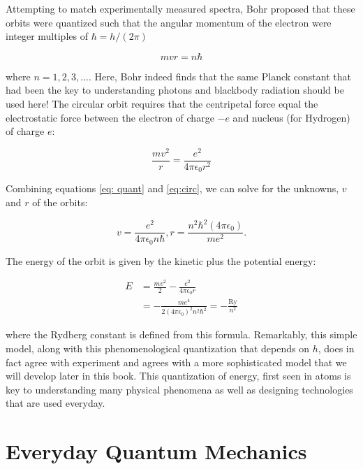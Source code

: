 Attempting to match experimentally measured spectra, Bohr proposed that these orbits were quantized such that the angular momentum of the electron were integer multiples of $\hbar = h/(2\pi) $

\begin{equation}
	mvr = n\hbar \label{eq: quant}
	\end{equation}

where $n = 1,2,3,... $. Here, Bohr indeed finds that the same Planck constant that had been the key to understanding photons and blackbody radiation should be used here! The circular orbit requires that the centripetal force equal the electrostatic force between the electron of charge $ -e$ and nucleus (for Hydrogen) of charge $ e $:

\begin{equation}
	\frac{mv^2}{r} = \frac{e^2}{4\pi\epsilon_0 r^2} \label{eq:circ}
\end{equation}

Combining equations \ref{eq: quant} and \ref{eq:circ}, we can solve for the unknowns, $ v $ and $ r $ of the orbits:

\begin{equation}
v = \frac{e^2}{4\pi\epsilon_0 n\hbar}, r = \frac{n^2\hbar^2 (4\pi\epsilon_0)}{me^2}.
\end{equation}

The energy of the orbit is given by the kinetic plus the potential energy:

\begin{align}
	E &= \frac{mv^2}{2} - \frac{e^2}{4\pi\epsilon_0 r } \\
	&= -\frac{m e^4}{2(4\pi\epsilon_0)^2 n^2\hbar^2} = -\frac{\text{Ry}}{n^2}
\end{align}

where the Rydberg constant is defined from this formula. Remarkably, this simple model, along with this phenomenological quantization that depends on $ h $, does in fact agree with experiment and agrees with a more sophisticated model that we will develop later in this book. This quantization of energy, first seen in atoms is key to understanding many physical phenomena as well as designing technologies that are used everyday. 

\section{Everyday Quantum Mechanics}


